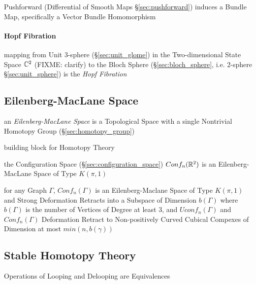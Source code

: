 Pushforward (Differential of Smooth Maps \S\ref{sec:pushforward}) induces a
Bundle Map, specifically a Vector Bundle Homomorphism



\paragraph{Hopf Fibration}\label{sec:hopf_fibration}\hfill

mapping from Unit $3$-sphere (\S\ref{sec:unit_glome}) in the Two-dimensional
State Space $\mathbb{C}^2$ (FIXME: clarify) to the Bloch Sphere
(\S\ref{sec:bloch_sphere}, i.e. $2$-sphere \S\ref{sec:unit_sphere}) is the
\emph{Hopf Fibration}



\subsection{Eilenberg-MacLane Space}\label{sec:eilenberg_maclane_space}

an \emph{Eilenberg-MacLane Space} is a Topological Space with a single
Nontrivial Homotopy Group (\S\ref{sec:homotopy_group})

building block for Homotopy Theory

the Configuration Space (\S\ref{sec:configuration_space}) $Conf_n(\mathbb{R}^2)$
is an Eilenberg-MacLane Space of Type $K(\pi,1)$

for any Graph $\Gamma$, $Conf_n(\Gamma)$ is an Eilenberg-Maclane Space of Type
$K(\pi,1)$ and Strong Deformation Retracts into a Subspace of Dimension
$b(\Gamma)$ where $b(\Gamma)$ is the number of Vertices of Degree at least 3,
and $Uconf_n(\Gamma)$ and $Conf_n(\Gamma)$ Deformation Retract to
Non-positively Curved Cubical Compexes of Dimension at most $min(n,b(\gamma))$



\subsection{Stable Homotopy Theory}\label{sec:stable_homotopy}

Operations of Looping and Delooping are Equivalences

